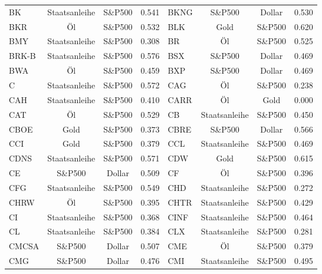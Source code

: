 \begin{longtable}{l c c c | l c c c}
    BK     & Staatsanleihe & S\&P500   & 0.541         & BKNG   & S\&P500       & Dollar    & 0.530         \\
    BKR    & Öl            & S\&P500   & 0.532         & BLK    & Gold          & S\&P500   & 0.620         \\
    BMY    & Staatsanleihe & S\&P500   & 0.308         & BR     & Öl            & S\&P500   & 0.525         \\
    BRK-B  & Staatsanleihe & S\&P500   & 0.576         & BSX    & S\&P500       & Dollar    & 0.469         \\
    BWA    & Öl            & S\&P500   & 0.459         & BXP    & S\&P500       & Dollar    & 0.469         \\
    C      & Staatsanleihe & S\&P500   & 0.572         & CAG    & Öl            & S\&P500   & 0.238         \\
    CAH    & Staatsanleihe & S\&P500   & 0.410         & CARR   & Öl            & Gold      & 0.000         \\
    CAT    & Öl            & S\&P500   & 0.529         & CB     & Staatsanleihe & S\&P500   & 0.450         \\
    CBOE   & Gold          & S\&P500   & 0.373         & CBRE   & S\&P500       & Dollar    & 0.566         \\
    CCI    & Gold          & S\&P500   & 0.379         & CCL    & Staatsanleihe & S\&P500   & 0.469         \\
    CDNS   & Staatsanleihe & S\&P500   & 0.571         & CDW    & Gold          & S\&P500   & 0.615         \\
    CE     & S\&P500       & Dollar    & 0.509         & CF     & Öl            & S\&P500   & 0.396         \\
    CFG    & Staatsanleihe & S\&P500   & 0.549         & CHD    & Staatsanleihe & S\&P500   & 0.272         \\
    CHRW   & Öl            & S\&P500   & 0.395         & CHTR   & Staatsanleihe & S\&P500   & 0.429         \\
    CI     & Staatsanleihe & S\&P500   & 0.368         & CINF   & Staatsanleihe & S\&P500   & 0.464         \\
    CL     & Staatsanleihe & S\&P500   & 0.384         & CLX    & Staatsanleihe & S\&P500   & 0.281         \\
    CMCSA  & S\&P500       & Dollar    & 0.507         & CME    & Öl            & S\&P500   & 0.379         \\
    CMG    & S\&P500       & Dollar    & 0.476         & CMI    & Staatsanleihe & S\&P500   & 0.495         \\

\end{longtable}

